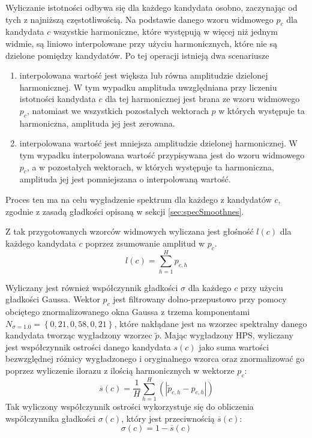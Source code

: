 \documentclass[12pt,a4paper,twoside]{mwart}
\begin{document}
Wyliczanie istotności odbywa się dla każdego kandydata osobno, zaczynając od tych z najniższą częstotliwością. Na podstawie danego wzoru widmowego $p_c$ dla kandydata $c$ wszystkie harmoniczne, które występują w więcej niż jednym widmie, są liniowo interpolowane przy użyciu harmonicznych, które nie są dzielone pomiędzy kandydatów. Po tej operacji istnieją dwa scenariusze
\begin{enumerate}
\item interpolowana wartość jest większa lub równa amplitudzie dzielonej harmonicznej. W tym wypadku amplituda uwzględniana przy liczeniu istotności kandydata $c$ dla tej harmonicznej jest brana ze wzoru widmowego $p_c$, natomiast we wszystkich pozostałych wektorach $p$ w których występuje ta harmoniczna, amplituda jej jest zerowana.
\item interpolowana wartość jest mniejsza amplitudzie dzielonej harmonicznej. W tym wypadku interpolowana wartość przypisywana jest do wzoru widmowego $p_c$, a w pozostałych wektorach, w których występuje ta harmoniczna, amplituda jej jest pomniejszana o interpolowaną wartość.
\end{enumerate}
Proces ten ma na celu wygładzenie spektrum dla każdego z kandydatów $c$, zgodnie z zasadą gładkości opisaną w sekcji \ref{sec:specSmoothnes}.

Z tak przygotowanych wzorców widmowych wyliczana jest głośność $l(c)$ dla każdego kandydata $c$ poprzez zsumowanie amplitud w $p_c$.
\begin{equation}\label{eq:inharmonicity:loudness}
  l(c) = \sum_{h=1}^H p_{c,h}
\end{equation}

Wyliczany jest również współczynnik gładkości $\sigma$ dla każdego $c$ przy użyciu gładkości Gaussa. Wektor $p_c$ jest filtrowany dolno-przepustowo przy pomocy obciętego znormalizowanego okna Gaussa z trzema komponentami $N_{\sigma = 1.0} = \left\{0,21, 0,58, 0,21\right\}$, które nakłądane jest na wzorzec spektralny danego kandydata tworząc wygładzony wzorzec $\widetilde{p}$. Mając wygładzony HPS, wyliczany jest współczynnik ostrości danego kandydata $s(c)$ jako suma wartości bezwzględnej różnicy wygładzonego i oryginalnego wzorca oraz znormalizować go poprzez wyliczenie ilorazu z ilością harmonicznych w wektorze $p_c$:
\begin{equation}\label{eq:inharmonicity:sharpness}
  \overline{s}(c) = \frac{1}{H}\sum_{h=1}^H \left(\left|\widetilde{p}_{c,h} - p_{c,h}\right|\right)
\end{equation}
Tak wyliczony współczynnik ostrości wykorzystuje się do obliczenia współczynnika gładkości $\sigma(c)$, który jest przeciwnością $\overline{s}(c)$:
\begin{equation}\label{eq:inharmonicity:smoothnes}
  \sigma(c) = 1 - \overline{s}(c) 
\end{equation}
\end{document}
